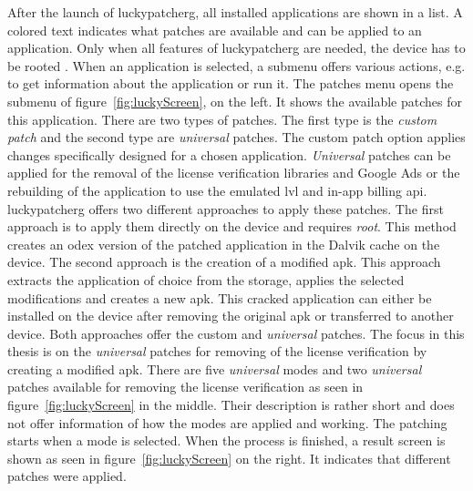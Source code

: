 After the launch of \gls{luckypatcherg}, all installed applications are shown in a list.
A colored text indicates what patches are available and can be applied to an application.
Only when all features of \gls{luckypatcherg} are needed, the device has to be rooted \cite{luckyPatcherOfficial}.
\newline
When an application is selected, a submenu offers various actions, e.g. to get information about the application or run it.
The patches menu opens the submenu of figure~\ref{fig:luckyScreen}, on the left.
It shows the available patches for this application.
\newline
There are two types of patches.
The first type is the \textit{custom patch} and the second type are \textit{universal} patches.
The custom patch option applies changes specifically designed for a chosen application.
\newline
\textit{Universal} patches can be applied for the removal of the license verification libraries and Google Ads or the rebuilding of the application to use the emulated \gls{lvl} and in-app billing \gls{api}.
\newline
\gls{luckypatcherg} offers two different approaches to apply these patches.
The first approach is to apply them directly on the device and requires \textit{root}.
This method creates an \gls{odex} version of the patched application in the Dalvik cache on the device.
The second approach is the creation of a modified \gls{apk}.
This approach extracts the application of choice from the storage, applies the selected modifications and creates a new \gls{apk}.
This cracked application can either be installed on the device after removing the original \gls{apk} or transferred to another device.
\newline
Both approaches offer the custom and \textit{universal} patches.
\newline
\newline
The focus in this thesis is on the \textit{universal} patches for removing of the license verification by creating a modified \gls{apk}.
\newline
There are five \textit{universal} modes and two \textit{universal} patches available for removing the license verification as seen in figure~\ref{fig:luckyScreen} in the middle.
Their description is rather short and does not offer information of how the modes are applied and working.
\newline
The patching starts when a mode is selected.
When the process is finished, a result screen is shown as seen in figure~\ref{fig:luckyScreen} on the right.
It indicates that different patches were applied.
